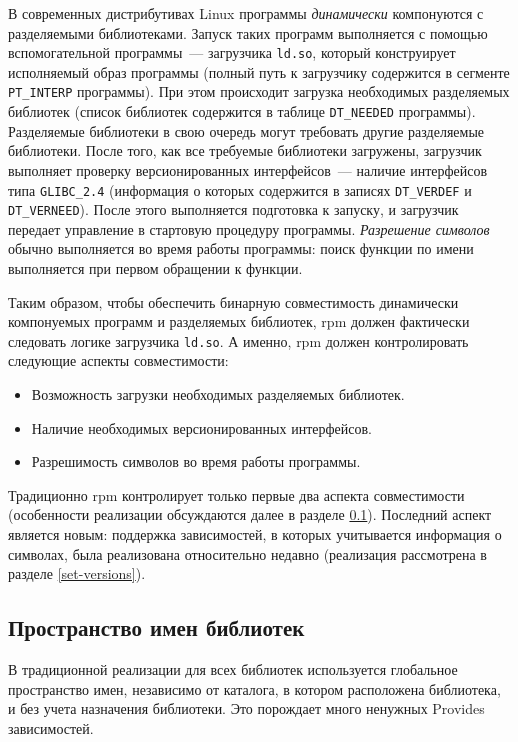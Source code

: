 \documentclass[russian,a4paper,12pt,titlepage]{article}
\begin{document}
В современных дистрибутивах Linux программы \emph{динамически} компонуются с разделяемыми библиотеками.
Запуск таких программ выполняется с помощью вспомогательной программы~--- загрузчика \verb|ld.so|,
который конструирует исполняемый образ программы (полный путь к загрузчику содержится в сегменте \verb|PT_INTERP| программы).
При этом происходит загрузка необходимых разделяемых библиотек (список библиотек содержится в таблице \verb|DT_NEEDED| программы).
Разделяемые библиотеки в свою очередь могут требовать другие разделяемые библиотеки.  После того, как все требуемые библиотеки
загружены, загрузчик выполняет проверку версионированных интерфейсов~--- наличие интерфейсов типа \verb|GLIBC_2.4| (информация
о которых содержится в записях \verb|DT_VERDEF| и \verb|DT_VERNEED|).  После этого выполняется подготовка к запуску, и загрузчик
передает управление в стартовую процедуру программы.  \emph{Разрешение символов} обычно выполняется во время работы программы:
поиск функции по имени выполняется при первом обращении к функции.

Таким образом, чтобы обеспечить бинарную совместимость динамически компонуемых программ и разделяемых библиотек,
rpm должен фактически следовать логике загрузчика \verb|ld.so|.  А именно, rpm должен контролировать следующие
аспекты совместимости:
\begin{itemize}
\item Возможность загрузки необходимых разделяемых библиотек.
\item Наличие необходимых версионированных интерфейсов.
\item Разрешимость символов во время работы программы.
\end{itemize}

Традиционно rpm контролирует только первые два аспекта совместимости (особенности реализации обсуждаются
далее в разделе \ref{lib-namespace}).  Последний аспект является новым: поддержка зависимостей, в которых учитывается
информация о символах, была реализована относительно недавно (реализация рассмотрена в разделе \ref{set-versions}).

\subsection{Пространство имен библиотек}
\label{lib-namespace}
В традиционной реализации для всех библиотек используется глобальное пространство имен, независимо
от каталога, в котором расположена библиотека, и без учета назначения библиотеки.  Это порождает
много ненужных Provides зависимостей.
\end{document}
